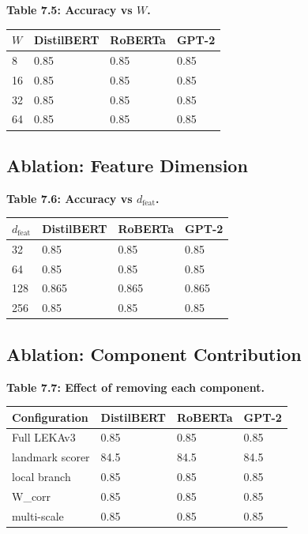 \textbf{Table 7.5: Accuracy vs $W$.}

\begin{table}[H]
\centering
\small
\begin{tabular}{llll}
\toprule
\textbf{$W$} & \textbf{DistilBERT} & \textbf{RoBERTa} & \textbf{GPT-2} \\
\midrule
8 & 0.85 & 0.85 & 0.85 \\
16 & 0.85 & 0.85 & 0.85 \\
32 & 0.85 & 0.85 & 0.85 \\
64 & 0.85 & 0.85 & 0.85 \\
\bottomrule
\end{tabular}
\end{table}

\subsection{Ablation: Feature Dimension}

\textbf{Table 7.6: Accuracy vs $d_\text{feat}$.}

\begin{table}[H]
\centering
\small
\begin{tabular}{llll}
\toprule
\textbf{$d_\text{feat}$} & \textbf{DistilBERT} & \textbf{RoBERTa} & \textbf{GPT-2} \\
\midrule
32 & 0.85 & 0.85 & 0.85 \\
64 & 0.85 & 0.85 & 0.85 \\
128 & 0.865 & 0.865 & 0.865 \\
256 & 0.85 & 0.85 & 0.85 \\
\bottomrule
\end{tabular}
\end{table}

\subsection{Ablation: Component Contribution}

\textbf{Table 7.7: Effect of removing each component.}

\begin{table}[H]
\centering
\small
\begin{tabular}{llll}
\toprule
\textbf{Configuration} & \textbf{DistilBERT} & \textbf{RoBERTa} & \textbf{GPT-2} \\
\midrule
Full LEKAv3 & 0.85 & 0.85 & 0.85 \\
landmark scorer & 84.5 & 84.5 & 84.5 \\
local branch & 0.85 & 0.85 & 0.85 \\
W\_corr & 0.85 & 0.85 & 0.85 \\
multi-scale & 0.85 & 0.85 & 0.85 \\
\bottomrule
\end{tabular}
\end{table}

